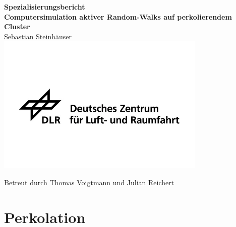 \documentclass[a4paper, 12pt]{scrartcl}
\author{Sebastian Steinhäuser}
\begin{document}
\begin{center}
\Large{\textbf{Spezialisierungsbericht}}
\\
\vspace{1cm}
\Huge{\textbf{Computersimulation aktiver Random-Walks auf perkolierendem Cluster}}
\\
\vspace{1cm}
\Large{Sebastian Steinhäuser}
\includegraphics[width=0.75\textwidth]{DLR.jpg}
\end{center}
\begin{center}
Betreut durch Thomas Voigtmann und Julian Reichert
\end{center}
\newpage
\tableofcontents
\newpage
\section{Perkolation}
\end{document}
